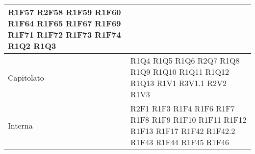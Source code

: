 \begin{center}
\begin{longtable}{|p{44mm}|p{22mm}|}
		R1F57 \newline
		R2F58 \newline
		R1F59 \newline
		R1F60 \newline
		R1F64 \newline
		R1F65 \newline
		R1F67 \newline
		R1F69 \newline
		R1F71 \newline
		R1F72 \newline
		R1F73 \newline
		R1F74 \newline
		R1Q2 \newline
		R1Q3
		\\
		\hline
		Capitolato &R1Q4 \newline
		R1Q5 \newline
		R1Q6 \newline
		R2Q7 \newline
		R1Q8 \newline
		R1Q9 \newline
		R1Q10 \newline
		R1Q11 \newline
		R1Q12 \newline
		R1Q13 \newline
		R1V1 \newline
		R3V1.1 \newline
		R2V2 \newline
		R1V3 
		\\
		\hline
		Interna &
		R2F1 \newline
		R1F3 \newline
		R1F4 \newline
		R1F6 \newline
		R1F7 \newline
		R1F8 \newline
		R1F9 \newline
		R1F10 \newline
		R1F11 \newline
		R1F12 \newline
		R1F13 \newline
		R1F17 \newline
		R1F42 \newline
		R1F42.2 \newline
		R1F43 \newline
		R1F44 \newline
		R1F45 \newline
		R1F46 \newline

\end{longtable}
\end{center}
